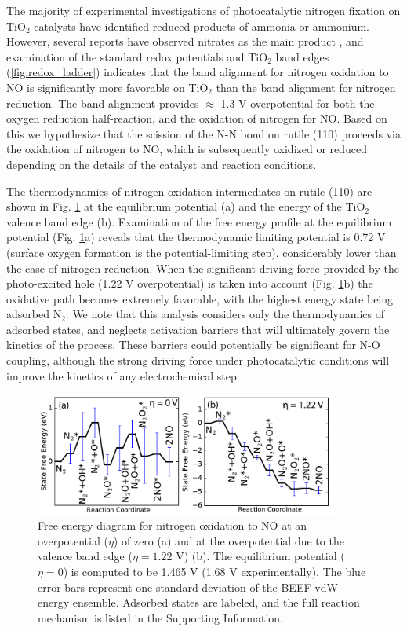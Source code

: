 \documentclass[journal=ascecg,manuscript=article,articletitle=true]{achemso}
\begin{document}
The majority of experimental investigations of photocatalytic nitrogen fixation on TiO$_2$ catalysts have identified reduced products of ammonia or ammonium. However, several reports have observed nitrates as the main product \cite{Bickley_1979, Yuan_2013}, and examination of the standard redox potentials and TiO$_2$ band edges (\ref{fig:redox_ladder}) indicates that the band alignment for nitrogen oxidation to NO is significantly more favorable on TiO$_2$ than the band alignment for nitrogen reduction. The band alignment provides $\approx$ 1.3 V overpotential for both the oxygen reduction half-reaction, and the oxidation of nitrogen for NO. Based on this we hypothesize that the scission of the N-N bond on rutile (110) proceeds via the oxidation of nitrogen to NO, which is subsequently oxidized or reduced depending on the details of the catalyst and reaction conditions.

The thermodynamics of nitrogen oxidation intermediates on rutile (110) are shown in Fig. \ref{fig:FED_oxid} at the equilibrium potential (a) and the energy of the TiO$_2$ valence band edge (b). Examination of the free energy profile at the equilibrium potential (Fig. \ref{fig:FED_oxid}a) reveals that the thermodynamic limiting potential is 0.72 V (surface oxygen formation is the potential-limiting step), considerably lower than the case of nitrogen reduction. When the significant driving force provided by the photo-excited hole (1.22 V overpotential) is taken into account (Fig. \ref{fig:FED_oxid}b) the oxidative path becomes extremely favorable, with the highest energy state being adsorbed N$_2$. We note that this analysis considers only the thermodynamics of adsorbed states, and neglects activation barriers that will ultimately govern the kinetics of the process. These barriers could potentially be significant for N-O coupling, although the strong driving force under photocatalytic conditions will improve the kinetics of any electrochemical step.

\begin{figure}
\includegraphics[width=0.9\textwidth]{figures/oxidative_FED.pdf}
\caption{Free energy diagram for nitrogen oxidation to NO at an overpotential ($\eta$) of zero (a) and at the overpotential due to the valence band edge ($\eta=1.22$ V) (b). The equilibrium potential ($\eta=0$) is computed to be 1.465 V (1.68 V experimentally). The blue error bars represent one standard deviation of the BEEF-vdW energy ensemble. Adsorbed states are labeled, and the full reaction mechanism is listed in the Supporting Information.}
\label{fig:FED_oxid}
\end{figure}
\end{document}
